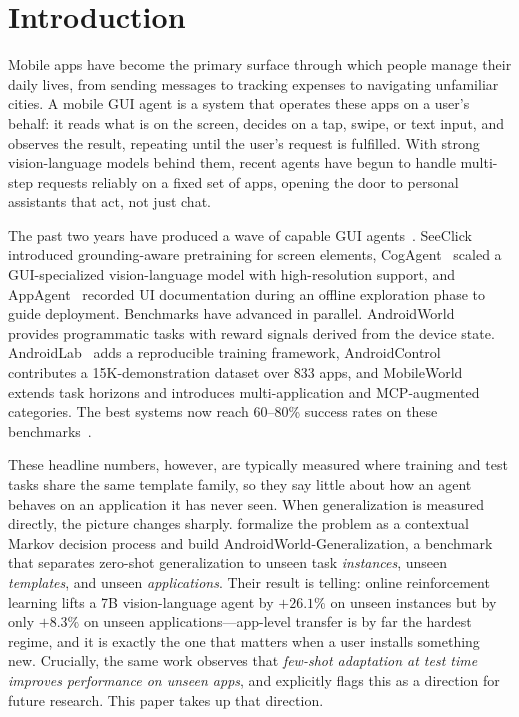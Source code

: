 \section{Introduction}
\label{sec:intro}

Mobile apps have become the primary surface through which people manage their
daily lives, from sending messages to tracking expenses to navigating
unfamiliar cities. A mobile GUI agent is a system that operates these apps on a
user's behalf: it reads what is on the screen, decides on a tap, swipe, or text
input, and observes the result, repeating until the user's request is fulfilled.
With strong vision-language models behind them, recent agents have begun to
handle multi-step requests reliably on a fixed set of apps, opening the door to
personal assistants that act, not just chat.

The past two years have produced a wave of capable GUI
agents~\citep{cheng2024seeclick,hong2024cogagent,yang2023appagent,guo2025agentsama}.
SeeClick~\citep{cheng2024seeclick} introduced grounding-aware pretraining for
screen elements, CogAgent~\citep{hong2024cogagent} scaled a GUI-specialized
vision-language model with high-resolution support, and
AppAgent~\citep{yang2023appagent} recorded UI documentation during an offline
exploration phase to guide deployment. Benchmarks have advanced in parallel.
AndroidWorld~\citep{rawles2024androidworld} provides programmatic tasks with
reward signals derived from the device state. AndroidLab~\citep{xu2024androidlab}
adds a reproducible training framework, AndroidControl~\citep{li2024androidcontrol}
contributes a 15K-demonstration dataset over 833 apps, and
MobileWorld~\citep{mobileworld2025} extends task horizons and introduces
multi-application and MCP-augmented categories. The best systems now reach
60--80\% success rates on these benchmarks~\citep{openmobile2026,mobilerl2025}.

These headline numbers, however, are typically measured where training and test
tasks share the same template family, so they say little about how an agent
behaves on an application it has never seen. When generalization is measured
directly, the picture changes sharply. \citet{gu2026generalization} formalize
the problem as a contextual Markov decision process and build
AndroidWorld-Generalization, a benchmark that separates zero-shot generalization
to unseen task \emph{instances}, unseen \emph{templates}, and unseen
\emph{applications}. Their result is telling: online reinforcement learning
lifts a 7B vision-language agent by $+26.1\%$ on unseen instances but by only
$+8.3\%$ on unseen applications---app-level transfer is by far the hardest
regime, and it is exactly the one that matters when a user installs something
new. Crucially, the same work observes that \emph{few-shot adaptation at test
time improves performance on unseen apps}, and explicitly flags this as a
direction for future research. This paper takes up that direction.

